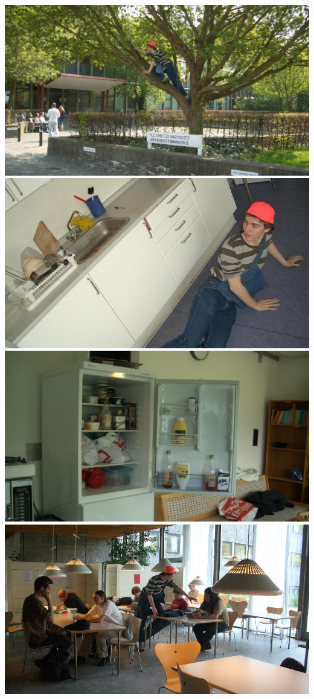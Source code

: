 \addtolength{\textwidth}{20mm}
\addtolength{\textheight}{50mm}
\addtolength{\hoffset}{-12mm}
\addtolength{\voffset}{-10mm}
\newpage
\includegraphics[width=\textwidth]{hco.jpg}
\newpage
\includegraphics[width=\textwidth]{opvask.jpg}
\newpage
\includegraphics[width=\textwidth]{koleskab.jpg}
\newpage
\includegraphics[width=\textwidth]{matKantinen.jpg}
